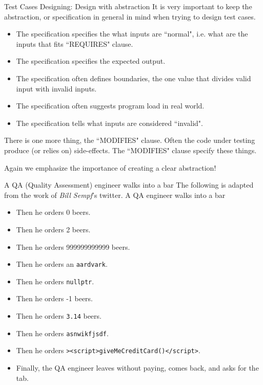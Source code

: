 \begin{frame}{Test Cases Designing: Design with abstraction}
It is very important to keep the abstraction, or specification in general in mind when trying to design test cases.
\begin{itemize}
	\item The specification specifies the what inputs are ``normal", i.e. what are the inputs that fits ``REQUIRES" clause.
	\item The specification specifies the expected output. 
	\item The specification often defines boundaries, the one value that divides valid input with invalid inputs.
	\item The specification often suggests program load in real world.
	\item The specification tells what inputs are considered ``invalid". 
\end{itemize}
There is one more thing, the ``MODIFIES" clause. Often the code under testing produce (or relies on) side-effects. The ``MODIFIES" clause specify these things.

\alert{Again we emphasize the importance of creating a clear abstraction!}
\end{frame}

\begin{frame}{A QA (Quality Assessment) engineer walks into a bar}
The following is adapted from the work of \textit{Bill Sempf}'s twitter.
\vspace{0.1in}
A QA engineer walks into a bar
\begin{itemize}
	\item Then he orders 0 beers.
	\item Then he orders 2 beers.
	\item Then he orders 999999999999 beers.
	\item Then he orders an \texttt{aardvark}.
	\item Then he orders \texttt{nullptr}.
	\item Then he orders -1 beers.
	\item Then he orders \texttt{3.14} beers.
	\item Then he orders \texttt{asnwikfjsdf}.
	\item Then he orders \texttt{><script>giveMeCreditCard()</script>}.
	\item Finally, the QA engineer leaves without paying, comes back, and asks for the tab.
\end{itemize}
\end{frame}

